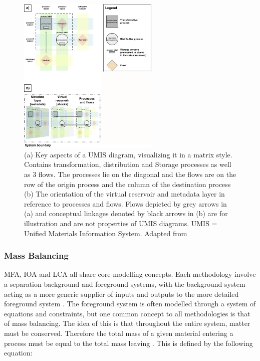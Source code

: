 \documentclass[ %
                    author={Tom Jager},
                supervisor={Dr. Daniel Schien},
                    degree={MEng},
                     title={A Bayesian Inference Engine for UMIS Structured Data},
                  subtitle={},
                      type={research},
                      year={2019} ]{dissertation}
\begin{document}
\begin{figure}[ht]
\centering
\includegraphics[width=0.6\textwidth]{images/umis_aspects.jpg}
\caption{(a) Key aspects of a UMIS diagram, visualizing it in a matrix style. Contains transformation, distribution and Storage processes as well as 3 flows. The processes lie on the diagonal and the flows are on the row of the origin process and the column of the destination process (b) The orientation of the virtual reservoir and metadata layer in reference to processes and flows. Flows depicted by grey arrows in (a) and conceptual linkages denoted by black arrows in (b) are for illustration and are not properties of UMIS diagrams. UMIS = Unified Materials Information System. Adapted from \cite{myers2019unified}}
\label{fig:umis_aspects}
\end{figure}

\subsubsection{Mass Balancing}
MFA, IOA and LCA all share core modelling concepts. Each methodology involve a separation background and foreground systems, with the background system acting as a more generic supplier of inputs and outputs to the more detailed foreground system \cite{pauliuk2016prospective}. The foreground system is often modelled through a system of equations and constraints, but one common concept to all methodologies is that of mass balancing. The idea of this is that throughout the entire system, matter must be conserved. Therefore the total mass of a given material entering a process must be equal to the total mass leaving \cite{brunner2004practical}. This is defined by the following equation:
\end{document}
